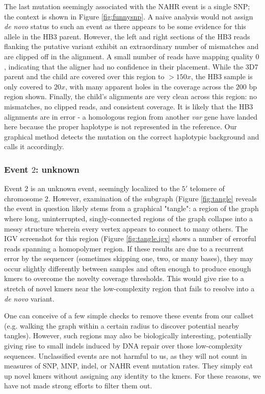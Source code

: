 The last mutation seemingly associated with the NAHR event is a single SNP; the context is shown in Figure \ref{fig:funnysnp}.  A naive analysis would not assign \textit{de novo} status to such an event as there appears to be some evidence for this allele in the HB3 parent.  However, the left and right sections of the HB3 reads flanking the putative variant exhibit an extraordinary number of mismatches and are clipped off in the alignment.  A small number of reads have mapping quality $0$, indicating that the aligner had no confidence in their placement.  While the 3D7 parent and the child are covered over this region to $> 150x$, the HB3 sample is only covered to $20x$, with many apparent holes in the coverage across the $200$ bp region shown.  Finally, the child's alignments are very clean across this region: no mismatches, no clipped reads, and consistent coverage.  It is likely that the HB3 alignments are in error - a homologous region from another \textit{var} gene have landed here because the proper haplotype is not represented in the reference.  Our graphical method detects the mutation on the correct haplotypic background and calls it accordingly.

\subsubsection{Event $2$: unknown}

Event $2$ is an unknown event, seemingly localized to the $5'$ telomere of chromosome $2$.  However, examination of the subgraph (Figure \ref{fig:tangle} reveals the event in question likely stems from a graphical "tangle": a region of the graph where long, uninterrupted, singly-connected regions of the graph collapse into a messy structure wherein every vertex appears to connect to many others.  The IGV screenshot for this region (Figure \ref{fig:tangle.igv} shows a number of errorful reads spanning a homopolymer region.  If these results are due to a recurrent error by the sequencer (sometimes skipping one, two, or many bases), they may occur slightly differently between samples and often enough to produce enough kmers to overcome the novelty coverage thresholds.  This would give rise to a stretch of novel kmers near the low-complexity region that fails to resolve into a \textit{de novo} variant.

One can conceive of a few simple checks to remove these events from our callset (e.g. walking the graph within a certain radius to discover potential nearby tangles).  However, such regions may also be biologically interesting, potentially giving rise to small indels induced by DNA repair over those low-complexity sequences.  Unclassified events are not harmful to us, as they will not count in measures of SNP, MNP, indel, or NAHR event mutation rates.  They simply eat up novel kmers without assigning any identity to the kmers.  For these reasons, we have not made strong efforts to filter them out.

